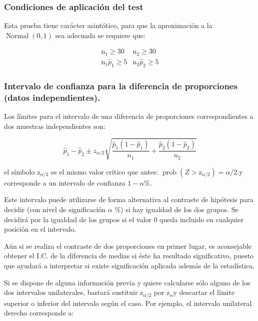 \documentclass[
]{article}
\begin{document}
\subsubsection{Condiciones de aplicación del test}\label{condiciones-de-aplicaciuxf3n-del-test}

Esta prueba tiene carácter asintótico, para que la aproximación a la \(\operatorname{Normal}(0,1)\) sea adecuada se requiere que:

\[
\begin{array}{cc}
\mathrm{n}_{1} \geq 30 & \mathrm{n}_{2} \geq 30 \\
\mathrm{n}_{1} \hat{p}_{1} \geq 5 & \mathrm{n}_{2} \hat{p}_{2} \geq 5
\end{array}
\]

\subsubsection{Intervalo de confianza para la diferencia de proporciones (datos independientes).}\label{intervalo-de-confianza-para-la-diferencia-de-proporciones-datos-independientes.}

Los límites para el intervalo de una diferencia de proporciones correspondientes a dos muestras independientes son:

\[
\hat{p}_{1}-\hat{p}_{2} \pm z_{\alpha / 2} \sqrt{\frac{\hat{p}_{1}\left(1-\hat{p}_{1}\right)}{n_{1}}+\frac{\hat{p}_{2}\left(1-\hat{p}_{2}\right)}{n_{2}}}
\]

el símbolo \(\mathrm{z}_{\alpha / 2}\) es el mismo valor crítico que antes: \(\operatorname{prob}\left(Z>\mathrm{z}_{\alpha / 2}\right)=\alpha / 2\).y corresponde a un intervalo de confianza \(1-\alpha \%\).

Este intervalo puede utilizarse de forma alternativa al contraste de hipótesis para decidir (con nivel de significación \(\alpha\) \%) si hay igualdad de los dos grupos. Se decidirá por la igualdad de los grupos si el valor 0 queda incluido en cualquier posición en el intervalo.

Aún si se realiza el contraste de dos proporciones en primer lugar, es aconsejable obtener el I.C. de la diferencia de medias si éste ha resultado significativo, puesto que ayudará a interpretar si existe significación aplicada además de la estadística.

Si se dispone de alguna información previa y quiere calcularse sólo alguno de los dos intervalos unilaterales, bastará sustituir \(\mathrm{z}_{\alpha / 2}\) por \(\mathrm{z}_{\alpha} \mathrm{y}\) descartar el límite superior o inferior del intervalo según el caso. Por ejemplo, el intervalo unilateral derecho corresponde a:
\end{document}

